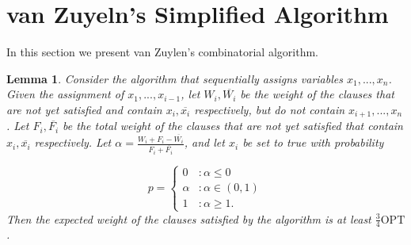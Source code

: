 \documentclass[11pt,letter]{article}
\newtheorem{lemma}{Lemma}
\begin{document}
\section{van Zuyeln's Simplified Algorithm}\label{S:vZ}

In this section we present van Zuylen's combinatorial algorithm.

\begin{lemma}
Consider the algorithm that sequentially assigns variables $x_1,...,x_n$. Given the assignment of $x_1,...,x_{i-1}$,
 let $W_i, \overline{W_i}$ be the weight of the clauses that are not yet satisfied and contain $x_i, \overline{x_i}$ respectively,
 but do not contain $x_{i+1}, ..., x_n$. Let $F_i, \overline{F_i}$ be the total weight of the clauses that are not yet satisfied
 that contain $x_i, \overline{x_i}$ respectively. Let $\alpha = \frac{W_i + F_i - \overline{W_i}}{F_i + \overline{F_i}}$, and let $x_i$ be set to true with probability

\begin{displaymath}
  p = \left\{
     \begin{array}{lr}
       0 & : \alpha \leq 0\\
       \alpha & : \alpha \in (0,1) \\
       1 & : \alpha \geq 1.
     \end{array}
   \right.
\end{displaymath}
Then the expected weight of the clauses satisfied by the algorithm is at least $\frac{3}{4} \mathrm{OPT}$.
\end{lemma}
\end{document}

